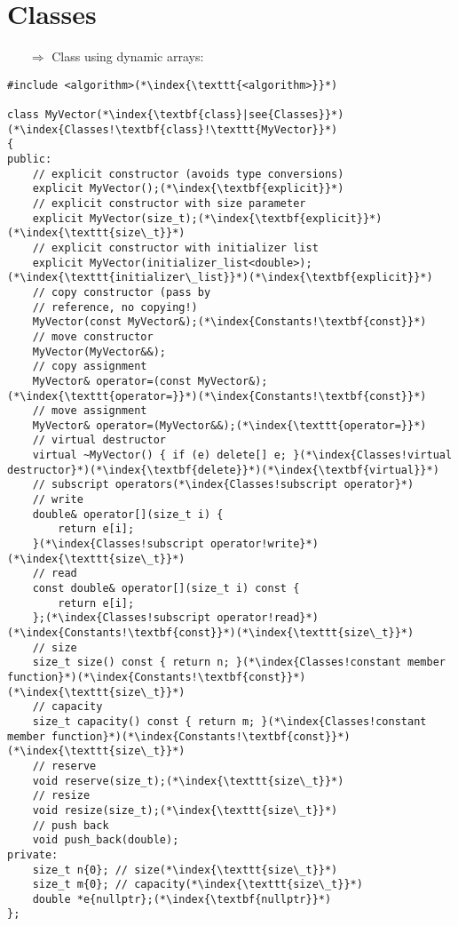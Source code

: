 \documentclass[10pt]{book}
\begin{document}
\section{Classes}
\begin{enumerate}
\item[$\Rightarrow$] Class using dynamic arrays:
\end{enumerate}
\begin{lstlisting}
#include <algorithm>(*\index{\texttt{<algorithm>}}*)

class MyVector(*\index{\textbf{class}|see{Classes}}*)(*\index{Classes!\textbf{class}!\texttt{MyVector}}*)
{
public:
    // explicit constructor (avoids type conversions)
    explicit MyVector();(*\index{\textbf{explicit}}*)
    // explicit constructor with size parameter
    explicit MyVector(size_t);(*\index{\textbf{explicit}}*)(*\index{\texttt{size\_t}}*)
    // explicit constructor with initializer list
    explicit MyVector(initializer_list<double>);(*\index{\texttt{initializer\_list}}*)(*\index{\textbf{explicit}}*)
    // copy constructor (pass by
    // reference, no copying!)
    MyVector(const MyVector&);(*\index{Constants!\textbf{const}}*)
    // move constructor
    MyVector(MyVector&&);
    // copy assignment
    MyVector& operator=(const MyVector&);(*\index{\texttt{operator=}}*)(*\index{Constants!\textbf{const}}*)
    // move assignment
    MyVector& operator=(MyVector&&);(*\index{\texttt{operator=}}*)
    // virtual destructor
    virtual ~MyVector() { if (e) delete[] e; }(*\index{Classes!virtual destructor}*)(*\index{\textbf{delete}}*)(*\index{\textbf{virtual}}*)
    // subscript operators(*\index{Classes!subscript operator}*)
    // write
    double& operator[](size_t i) {
        return e[i];
    }(*\index{Classes!subscript operator!write}*)(*\index{\texttt{size\_t}}*)
    // read
    const double& operator[](size_t i) const {
        return e[i];
    };(*\index{Classes!subscript operator!read}*)(*\index{Constants!\textbf{const}}*)(*\index{\texttt{size\_t}}*)
    // size
    size_t size() const { return n; }(*\index{Classes!constant member function}*)(*\index{Constants!\textbf{const}}*)(*\index{\texttt{size\_t}}*)
    // capacity
    size_t capacity() const { return m; }(*\index{Classes!constant member function}*)(*\index{Constants!\textbf{const}}*)(*\index{\texttt{size\_t}}*)
    // reserve
    void reserve(size_t);(*\index{\texttt{size\_t}}*)
    // resize
    void resize(size_t);(*\index{\texttt{size\_t}}*)
    // push back
    void push_back(double);
private:
    size_t n{0}; // size(*\index{\texttt{size\_t}}*)
    size_t m{0}; // capacity(*\index{\texttt{size\_t}}*)
    double *e{nullptr};(*\index{\textbf{nullptr}}*)
};
\end{lstlisting}
\end{document}
